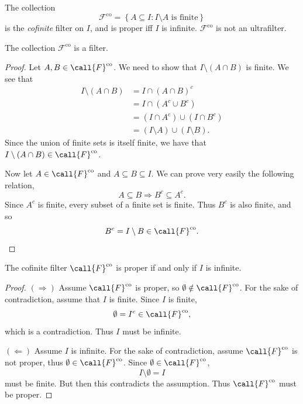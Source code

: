 {\begin{defn}
The collection
\[
\mathcal{F}^{\mathrm{co}}
=
\left\{
A \subseteq I : I \setminus A \text{ is finite}
\right\}
\]
is the \emph{cofinite} filter on \(I\), and is proper iff \(I\) is infinite.
\(\mathcal{F}^{\mathrm{co}}\) is not an ultrafilter.
\end{defn}

\begin{prop}
The collection \(\mathcal{F}^{\mathrm{co}}\) is a filter.
\end{prop}

\begin{proof}
Let \(A, B \in \call{F}^{\mathrm{co}}\). We need to show that
\(I \setminus (A \cap B)\) is finite. We see that
\begin{align*}
    I \setminus (A \cap B)
    & = I \cap (A \cap B)^c \\
    & = I \cap (A^c \cup B^c) \\
    & = (I \cap A^c) \cup (I \cap B^c) \\
    & = (I \setminus A) \cup (I \setminus B).
\end{align*}
Since the union of finite sets is itself finite, we have that
\(I \setminus (A \cap B) \in \call{F}^{\mathrm{co}}\).

Now let \(A \in \call{F}^{\mathrm{co}}\) and \(A \subseteq B \subseteq I\).
We can prove very easily the following relation,
\[
A \subseteq B \Rightarrow B^c \subseteq A^c.
\]
Since \(A^c\) is finite, every subset of a finite set is finite. Thus
\(B^c\) is also finite, and so
\[
B^c=I\setminus B \in \call{F}^{\mathrm{co}}.
\]
\end{proof}

\begin{prop}
The cofinite filter \(\call{F}^{\mathrm{co}}\) is proper if and only if
\(I\) is infinite.
\end{prop}

\begin{proof}
\noindent\((\Rightarrow)\)
Assume \(\call{F}^{\mathrm{co}}\) is proper, so
\(\emptyset \notin \call{F}^{\mathrm{co}}\). For the sake of contradiction,
assume that \(I\) is finite. Since \(I\) is
finite,
\[
\emptyset = I^c \in \call{F}^{\mathrm{co}},
\]
which is a contradiction. Thus \(I\) must be infinite.

\noindent\((\Leftarrow)\)
Assume \(I\) is infinite. For the sake of contradiction, assume
\(\call{F}^{\mathrm{co}}\) is not proper, thus
\(\emptyset \in \call{F}^{\mathrm{co}}\). Since
\(\emptyset \in \call{F}^{\mathrm{co}}\),
\[
I \setminus \emptyset=I
\]
must be finite. But then this contradicts the assumption. Thus
\(\call{F}^{\mathrm{co}}\) must be proper.
\end{proof}

}
